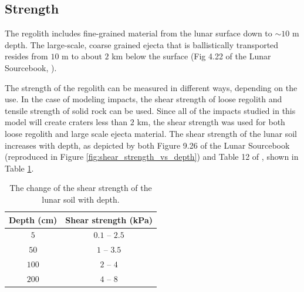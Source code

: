 \documentclass{article}
\begin{document}
\subsection{Strength}

The regolith includes fine-grained material from the lunar surface down to $\sim10$ m depth. The large-scale, coarse grained ejecta that is ballistically transported resides from $10$ m to about $2$ km below the surface (Fig 4.22 of the Lunar Sourcebook, \cite{heiken1991lunar}). 

The strength of the regolith can be measured in different ways, depending on the use. In the case of modeling impacts, the shear strength \citep[see Section 3 of][]{housen2011ejecta} of loose regolith and tensile strength of solid rock can be used. Since all of the impacts studied in this model will create craters less than $2$ km, the shear strength was used for both loose regolith and large scale ejecta material. The shear strength of the lunar soil increases with depth, as depicted by both Figure 9.26 of the Lunar Sourcebook (reproduced in Figure \ref{fig:shear_strength_vs_depth}) and Table 12 of \cite{slyuta2014physical}, shown in Table \ref{tab:shear_strength}.

\begin{table}[!htb]
	\begin{center}
		\caption{The change of the shear strength of the lunar soil with depth.}
		\label{tab:shear_strength}
		\begin{tabular}{c c}
			\hline
			Depth (cm)  & Shear strength (kPa)  \\
			\hline
			$5$  & $0.1$ -- $2.5$  \\
			$50$  & $1$ -- $3.5$   \\
			$100$ & $2$ -- $4$  \\
			$200$  & $4$ -- $8$  \\\hline
		\end{tabular}
	\end{center}
\end{table}
\end{document}
